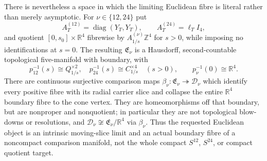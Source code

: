 \documentclass[10pt,letterpaper]{article}
\begin{document}
There is nevertheless a space in which the limiting Euclidean fibre is
literal rather than merely asymptotic.  For $\nu\in\{12,24\}$ put
\[
 A_T^{(12)}=\operatorname{diag}(Y_T,Y_T),\qquad
 A_T^{(24)}=\ell_T I_4,
\]
and quotient $[0,s_0]\times\mathbb R^4$ fibrewise by
$A_{1/s}^{(\nu)}\mathbb Z^4$ for $s>0$, while imposing no identifications
at $s=0$.  The resulting $\mathfrak E_\nu$ is a Hausdorff,
second-countable topological five-manifold with boundary, with
\[
 p_{12}^{-1}(s)\cong Q_{1/s}^{\times2},\quad
 p_{24}^{-1}(s)\cong C_{1/s}^{\times4}\quad(s>0),\qquad
 p_\nu^{-1}(0)\cong\mathbb R^4.
\]
There are continuous surjective comparison maps
$\beta_\nu:\mathfrak E_\nu\twoheadrightarrow\mathcal D_\nu$ which identify
every positive fibre with its radial carrier slice and collapse the entire
$\mathbb R^4$ boundary fibre to the cone vertex.  They are homeomorphisms off
that boundary, but are nonproper and nonquotient; in particular they are not
topological blow-downs or resolutions, and
$\mathcal D_\nu\not\cong\mathfrak E_\nu/\mathbb R^4$ via $\beta_\nu$.
Thus the requested Euclidean object is an intrinsic moving-slice limit and an
actual boundary fibre of a noncompact comparison manifold, not the whole
compact $S^{12}$, $S^{24}$, or compact quotient target.
\end{document}
